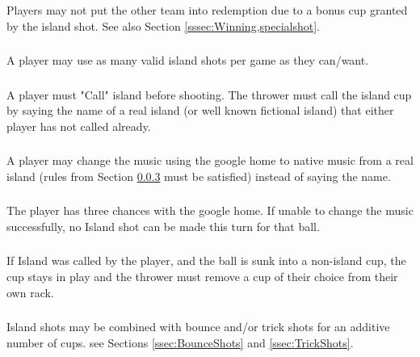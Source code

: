 		\subsubsection{}\label{sssec:IslandShots,winning}
			Players may not put the other team into redemption due to a bonus cup granted by the island shot.
            See also Section \ref{sssec:Winning,specialshot}.
		\subsubsection{}\label{sssec:IslandShots,times}
			A player may use as many valid island shots per game as they can/want.
		\subsubsection{}\label{sssec:IslandShots,calling}
			A player must "Call" island before shooting.
            The thrower must call the island cup by saying the name of a real island (or well known fictional island) that either player has not called already.
		\subsubsection{}\label{sssec:IslandShots,musicCalling}
			A player may change the music using the google home to native music from a real island (rules from Section \ref{sssec:IslandShots,calling} must be satisfied) instead of saying the name.
        \subsubsection{}\label{sssec:IslandShots,musicAttempts}
            The player has three chances with the google home. If unable to change the music successfully, no Island shot can be made this turn for that ball.
		\subsubsection{}\label{sssec:IslandShots,missincup}
			If Island was called by the player, and the ball is sunk into a non-island cup, the cup stays in play and the thrower must remove a cup of their choice from their own rack.	
		\subsubsection{}\label{sssec:IslandShots,combo}
			Island shots may be combined with bounce and/or trick shots for an additive number of cups.
            see Sections \ref{ssec:BounceShots} and \ref{ssec:TrickShots}.
